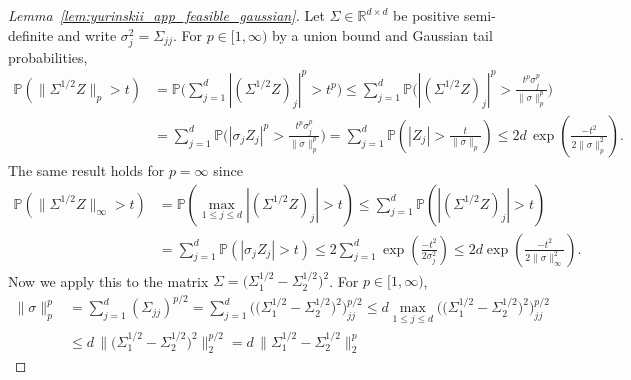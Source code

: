 \documentclass[11pt,lof]{puthesis}
\renewcommand{\P}{\ensuremath{\mathbb{P}}}
\newcommand{\R}{\ensuremath{\mathbb{R}}}
\theoremstyle{break}
\theoremstyle{proof}
\newtheorem{proof}{Proof}
\begin{document}
\begin{proof}[Lemma~\ref{lem:yurinskii_app_feasible_gaussian}]

  Let $\Sigma \in \R^{d \times d}$ be positive semi-definite
  and write $\sigma^2_j = \Sigma_{j j} $.
  For $p \in [1, \infty)$ by a union bound and
  Gaussian tail probabilities,
  \begin{align*}
    \P\left(\big\| \Sigma^{1/2} Z \big\|_p > t \right)
    &=
    \P\Bigg(
      \sum_{j=1}^d
      \left|
        \left(
          \Sigma^{1/2} Z
        \right)_j
      \right|^p
    > t^p \Bigg)
    \leq
    \sum_{j=1}^d
    \P\Bigg(
      \left|
        \left(
          \Sigma^{1/2} Z
        \right)_j
      \right|^p
      > \frac{t^p \sigma_j^p}{\|\sigma\|_p^p}
    \Bigg) \\
    &=
    \sum_{j=1}^d
    \P\Bigg(
      \left|
        \sigma_j Z_j
      \right|^p
      > \frac{t^p \sigma_j^p}{\|\sigma\|_p^p}
    \Bigg)
    =
    \sum_{j=1}^d
    \P\left(
      \left| Z_j \right|
      > \frac{t}{\|\sigma\|_p}
    \right)
    \leq
    2 d \, \exp\left( \frac{-t^2}{2 \|\sigma\|_p^2} \right).
  \end{align*}
  The same result holds for $p = \infty$ since
  \begin{align*}
    \P\left(\big\| \Sigma^{1/2} Z \big\|_\infty > t \right)
    &=
    \P\left(
      \max_{1 \leq j \leq d}
      \left|
        \left(
          \Sigma^{1/2} Z
        \right)_j
      \right|
    > t \right)
    \leq
    \sum_{j=1}^d
    \P\left(
      \left|
        \left(
          \Sigma^{1/2} Z
        \right)_j
      \right|
      > t
    \right) \\
    &=
    \sum_{j=1}^d
    \P\left(
      \left|
        \sigma_j Z_j
      \right|
      > t
    \right)
    \leq
    2 \sum_{j=1}^d
    \exp\left( \frac{-t^2}{2 \sigma_j^2} \right)
    \leq
    2 d
    \exp\left( \frac{-t^2}{2 \|\sigma\|_\infty^2} \right).
  \end{align*}
  Now we apply this to the matrix
  $\Sigma = \big(\Sigma_1^{1/2} - \Sigma_2^{1/2}\big)^2$.
  For $p \in [1, \infty)$,
  \begin{align*}
    \|\sigma\|_p^p
    &=
    \sum_{j=1}^d (\Sigma_{j j})^{p/2}
    =
    \sum_{j=1}^d
    \Big(\big(\Sigma_1^{1/2} - \Sigma_2^{1/2}\big)^2\Big)_{j j}^{p/2}
    \leq
    d \max_{1 \leq j \leq d}
    \Big(\big(\Sigma_1^{1/2} - \Sigma_2^{1/2}\big)^2\Big)_{j j}^{p/2} \\
    &\leq
    d \, \Big\|\big(\Sigma_1^{1/2} - \Sigma_2^{1/2}\big)^2\Big\|_2^{p/2}
    =
    d \, \big\|\Sigma_1^{1/2} - \Sigma_2^{1/2}\big\|_2^p

\end{align*}
\end{proof}
\end{document}
